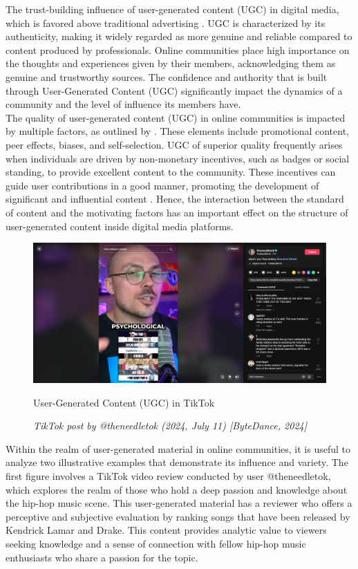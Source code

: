 The trust-building influence of user-generated content (UGC) in digital media, which is favored above traditional advertising \parencite{v22}. UGC is characterized by its authenticity, making it widely regarded as more genuine and reliable compared to content produced by professionals. Online communities place high importance on the thoughts and experiences given by their members, acknowledging them as genuine and trustworthy sources. The confidence and authority that is built through User-Generated Content (UGC) significantly impact the dynamics of a community and the level of influence its members have. \\

The quality of user-generated content (UGC) in online communities is impacted by multiple factors, as outlined by \textcite{luca21}. These elements include promotional content, peer effects, biases, and self-selection. UGC of superior quality frequently arises when individuals are driven by non-monetary incentives, such as badges or social standing, to provide excellent content to the community. These incentives can guide user contributions in a good manner, promoting the development of significant and influential content \parencite{luca21}. Hence, the interaction between the standard of content and the motivating factors has an important effect on the structure of user-generated content inside digital media platforms.\pagebreak

\begin{figure}[h]
    \centering
    \includegraphics[width=0.9\linewidth]{mainmatter/images/ugc3.png}
    \caption{User-Generated Content (UGC) in TikTok}
    \caption*{\textit{TikTok post by @theneedletok (2024, July 11) [ByteDance, 2024]}}
    \label{fig:myfig3}
\end{figure}
Within the realm of user-generated material in online communities, it is useful to analyze two illustrative examples that demonstrate its influence and variety. The first figure involves a TikTok video review conducted by user @theneedletok, which explores the realm of those who hold a deep passion and knowledge about the hip-hop music scene. This user-generated material has a reviewer who offers a perceptive and subjective evaluation by ranking songs that have been released by Kendrick Lamar and Drake. This content provides analytic value to viewers seeking knowledge and a sense of connection with fellow hip-hop music enthusiasts who share a passion for the topic. \pagebreak

